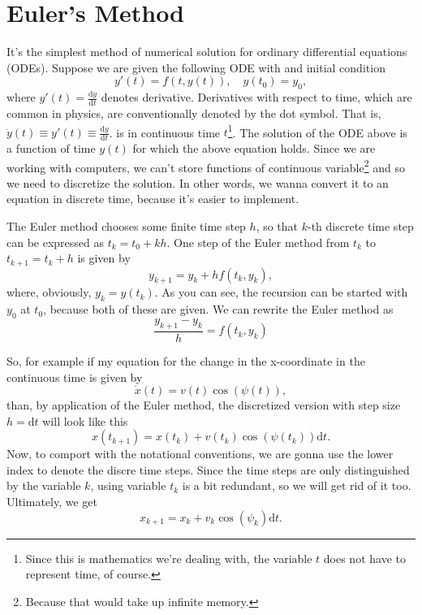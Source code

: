 \documentclass[a4paper]{article}
\begin{document}
\section{Euler's Method}\label{sec:euler_method}
It's the simplest method of numerical solution for ordinary differential equations (ODEs).
Suppose we are given the following ODE with and initial condition
\begin{equation}\label{eq:ode}
	y'(t) = f(t, y(t)), \quad y(t_0) = y_0,
\end{equation}
where \( y'(t) = \frac{\mathrm{d}y}{\mathrm{d}t} \) denotes derivative.
Derivatives with respect to time, which are common in physics, are conventionally denoted by the dot symbol. 
That is, \( \dot{y}(t) \equiv y'(t) \equiv \frac{\mathrm{d}y}{\mathrm{d}t} \).
 is in continuous time \( t \)\footnote{Since this is mathematics we're dealing with, the variable \( t \) does not have to represent time, of course.}.
The solution of the ODE above is a function of time \( y(t) \) for which the above equation holds.
Since we are working with computers, we can't store functions of continuous variable\footnote{Because that would take up infinite memory.} and so we need to discretize the solution.
In other words, we wanna convert it to an equation in discrete time, because it's easier to implement.

The Euler method chooses some finite time step \( h \), so that \( k \)-th discrete time step can be expressed as \( t_k = t_0 + kh \).
One step of the Euler method from \( t_k \) to \( t_{k+1}  = t_k + h \) is given by
\begin{equation}
	y_{k+1} = y_k + hf(t_k, y_k),
\end{equation}
where, obviously, \( y_k = y(t_k) \).
As you can see, the recursion can be started with \( y_0 \) at \( t_0 \), because both of these are given.
We can rewrite the Euler method as 
\begin{equation}
	\frac{y_{k+1} - y_k}{h} = f(t_k, y_k)
\end{equation}

So, for example if my equation for the change in the x-coordinate in the continuous time is given by
\begin{equation}
	\dot{x}(t) = v(t)\cos(\psi(t)),
\end{equation}
than, by application of the Euler method, the discretized version with step size \( h = \mathrm{d}t \) will look like this
\begin{equation}\label{}
	x(t_{k+1}) = x(t_{k}) + v(t_k)\cos(\psi(t_k)) \mathrm{d}t.
\end{equation}
Now, to comport with the notational conventions, we are gonna use the lower index to denote the discre time steps. Since the time steps are only distinguished by the variable \( k \), using variable \( t_k \) is a bit redundant, so we will get rid of it too.
Ultimately, we get
\begin{equation}\label{eq:ode_euler}
	x_{k+1} = x_{k} + v_k\cos(\psi_k) \mathrm{d}t.
\end{equation}
\end{document}
